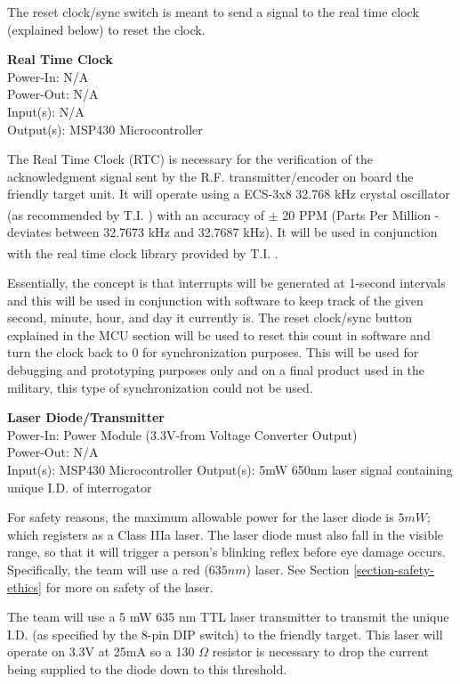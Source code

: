 \documentclass[letterpaper,10pt]{article}
\begin{document}
\begin{spacing}{1.15}
The reset clock/sync switch is meant to send a signal to the real time clock (explained below) to reset the clock.

\normalsize\textbf{Real Time Clock}\\
Power-In: N/A \\
Power-Out: N/A \\
Input(s): N/A \\
Output(s): MSP430 Microcontroller

The Real Time Clock (RTC) is necessary for the verification of the acknowledgment signal sent by the R.F. transmitter/encoder on board the friendly target unit. It will operate using a ECS-3x8 32.768 kHz crystal oscillator (as recommended by T.I. \textsuperscript{\cite{RTC-Implementation}}) with an accuracy of $\pm$ 20 PPM \textsuperscript{\cite{Crystal}} (Parts Per Million - deviates between 32.7673 kHz and 32.7687 kHz). It will be used in conjunction with the real time clock library provided by T.I. \textsuperscript{\cite{RTC-Library}}.

Essentially, the concept is that interrupts will be generated at 1-second intervals and this will be used in conjunction with software to keep track of the given second, minute, hour, and day it currently is. The reset clock/sync button explained in the MCU section will be used to reset this count in software and turn the clock back to 0 for synchronization purposes. This will be used for debugging and prototyping purposes only and on a final product used in the military, this type of synchronization could not be used.

\normalsize\textbf{Laser Diode/Transmitter}\\
Power-In: Power Module (3.3V-from Voltage Converter Output) \\
Power-Out: N/A \\
Input(s): MSP430 Microcontroller
Output(s):  5mW 650nm laser signal containing unique I.D. of interrogator 

For safety reasons, the maximum allowable power for the laser diode is $5mW$; which registers as a Class IIIa laser. The laser diode must also fall in the visible range, so that it will trigger a person's blinking reflex before eye damage occurs. Specifically, the team will use a red ($635nm$) laser. See Section \ref{section-safety-ethics} for more on safety of the laser. 

The team will use a 5 mW 635 nm TTL laser transmitter to transmit the unique I.D. (as specified by the 8-pin DIP switch) to the friendly target. This laser will operate on 3.3V at 25mA so a 130 $\Omega$  resistor is necessary to drop the current being supplied to the diode down to this threshold. 


\end{spacing}
\end{document}
